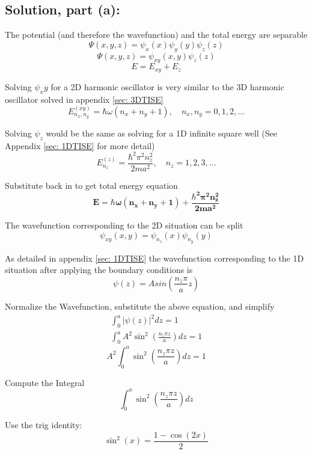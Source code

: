 \documentclass[12pt]{article}
\begin{document}
    \subsection{Solution, part (a):}
        The potential (and therefore the wavefunction) and the total energy are separable
        \[
            \Psi(x, y, z) = \psi_x(x) \psi_y(y) \psi_z(z)
        \]
        \[
            \Psi(x,y,z) = \psi_{xy} (x,y) \psi_z(z)
        \]
        \[
            E = E_{xy} + E_z
        \]

        Solving $\psi_xy$ for a 2D harmonic oscillator is very similar to the 3D harmonic oscillator solved in appendix \ref{sec: 3DTISE}
        \[
            E_{n_x,n_y}^{(xy)} = \hbar \omega (n_x + n_y + 1), \quad n_x, n_y = 0, 1, 2, \dots
        \]

        Solving $\psi_z$ would be the same as solving for a 1D infinite square well (See Appendix \ref{sec: 1DTISE} for more detail)
        \[
            E_{n_z}^{(z)} = \frac{\hbar^2 \pi^2 n_z^2}{2ma^2}, \quad n_z = 1, 2, 3, \dots
        \]

        Substitute back in to get total energy equation
        \[
            \boldsymbol{\boxed{E = \hbar \omega (n_x + n_y + 1) + \frac{\hbar^2 \pi^2 n_z^2}{2ma^2}}}
        \]
    
        The wavefunction corresponding to the 2D situation can be split
        \[
            \psi_{xy}(x,y) = \psi_{n_z}(x) \psi_{n_y}(y)
        \]

        As detailed in appendix \ref{sec: 1DTISE} the wavefunction corresponding to the 1D situation after applying the boundary conditions is
        \[
            \psi(z) = A sin \left(\frac{n_z \pi}{a} z \right)
        \]

        Normalize the Wavefunction, substitute the above equation, and simplify
        \begin{align*}
            \int_0^a |\psi(z)|^2 dz = 1 \\
            \int_0^a A^2 \sin^2\left( \frac{n_z \pi z}{a} \right) dz = 1
        \end{align*}
        \begin{equation} \label{eq: A}
            A^2 \int_0^a \sin^2\left( \frac{n_z \pi z}{a} \right) dz = 1
        \end{equation}
            
        Compute the Integral
        \[
            \int_0^a \sin^2\left( \frac{n_z \pi z}{a} \right) dz
        \]

        Use the trig identity:
        \[
            \sin^2(x) = \frac{1 - \cos(2x)}{2}
        \]
\end{document}
